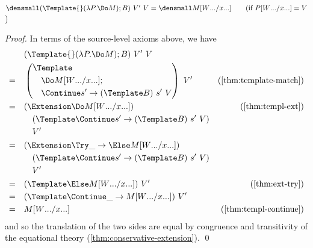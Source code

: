 \begin{lemma}
  \label{thm:template-do-match}
  \\
  $\den{(\Template{} (\lambda P. \Do M); B) ~ V' ~ V} = \den{M\subst{\many{x}}{\many{W}}}
  \qquad (\text{if } P\subst{\many{x}}{\many{W}} = V$)
\end{lemma}
\begin{proof}
  In terms of the source-level axioms above, we have
  \begin{align*}
    &\quad
    (\Template{} (\lambda P. \Do M); B) ~ V' ~ V
    \\
    =&\quad
    \left(
      \begin{aligned}
        &\Template \\
        &\quad \Do M\subst{\many{x}}{\many{W}}; \\
        &\quad \Continue s' \to (\Template B) ~ s' ~ V
      \end{aligned}
    \right)
    ~ V'
    &(\cref{thm:template-match})
    \\
    =&\quad
    \begin{aligned}[t]
      &(\Extension \Do M\subst{\many{x}}{\many{W}}) \\
      &\quad (\Template \Continue s' \to (\Template B) ~ s' ~ V) \\
      &\quad V'
    \end{aligned}
    &(\cref{thm:templ-ext})
    \\
    =&\quad
    \begin{aligned}[t]
      &(\Extension \Try \_ \to \Else M\subst{\many{x}}{\many{W}}) \\
      &\quad (\Template \Continue s' \to (\Template B) ~ s' ~ V) \\
      &\quad V'
    \end{aligned}
    \\
    =&\quad
    (\Template \Else M\subst{\many{x}}{\many{W}})
    ~ V'
    &(\cref{thm:ext-try})
    \\
    =&\quad
    (\Template \Continue \_ \to  M\subst{\many{x}}{\many{W}})
    ~ V'
    \\
    =&\quad
    M\subst{\many{x}}{\many{W}}    
    &(\cref{thm:templ-continue})
  \end{align*}
  and so the translation of the two sides are equal by congruence and transitivity of the equational theory (\cref{thm:conservative-extension}).
  \qed

\end{proof}
